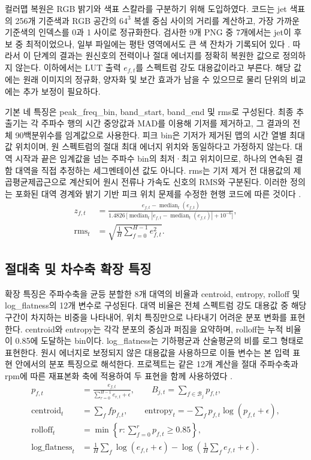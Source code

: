 \documentclass[11pt,a4paper]{article}
\newcommand{\sourceproject}{\citep{project2026}}
\begin{document}
컬러맵 복원은 RGB 밝기와 색표 스칼라를 구분하기 위해 도입하였다.
코드는 jet 색표의 256개 기준색과 RGB 공간의 $64^3$ 복셀 중심 사이의 거리를 계산하고, 가장 가까운 기준색의 인덱스를 0과 1 사이로 정규화한다.
검사한 9개 PNG 중 7개에서는 jet이 후보 중 최적이었으나, 일부 파일에는 평탄 영역에서도 큰 색 잔차가 기록되어 있다 \sourceproject.
따라서 이 단계의 결과는 원신호의 전력이나 절대 에너지를 정확히 복원한 값으로 정의하지 않는다.
이하에서는 LUT 출력 $e_{f,t}$를 스펙트럼 강도 대용값이라고 부른다.
해당 값에는 원래 이미지의 정규화, 양자화 및 보간 효과가 남을 수 있으므로 물리 단위의 비교에는 추가 보정이 필요하다.

기본 네 특징은 peak\_freq\_bin, band\_start, band\_end 및 rms로 구성된다.
최종 추출기는 각 주파수 행의 시간 중앙값과 MAD를 이용해 기저를 제거하고, 그 결과의 전체 90백분위수를 임계값으로 사용한다.
피크 bin은 기저가 제거된 맵의 시간 열별 최대값 위치이며, 원 스펙트럼의 절대 최대 에너지 위치와 동일하다고 가정하지 않는다.
대역 시작과 끝은 임계값을 넘는 주파수 bin의 최저·최고 위치이므로, 하나의 연속된 결함 대역을 직접 추정하는 세그멘테이션 값도 아니다.
rms는 기저 제거 전 대용값의 제곱평균제곱근으로 계산되어 원시 전류나 가속도 신호의 RMS와 구분된다.
이러한 정의는 포화된 대역 경계와 밝기 기반 피크 위치 문제를 수정한 현행 코드에 따른 것이다 \sourceproject.
\begin{align}
 z_{f,t}&=\frac{e_{f,t}-\operatorname{median}_{t}(e_{f,t})}
 {1.4826\,\big[\operatorname{median}_{t}|e_{f,t}-\operatorname{median}_{t}(e_{f,t})|+10^{-6}\big]},\\
 \mathrm{rms}_t&=\sqrt{\frac{1}{H}\sum_{f=0}^{H-1}e_{f,t}^{2}}.
\end{align}

\subsection{절대축 및 차수축 확장 특징}
확장 특징은 주파수축을 균등 분할한 8개 대역의 비율과 centroid, entropy, rolloff 및 log\_flatness의 12개 변수로 구성된다.
대역 비율은 전체 스펙트럼 강도 대용값 중 해당 구간이 차지하는 비중을 나타내어, 위치 특징만으로 나타내기 어려운 분포 변화를 표현한다.
centroid와 entropy는 각각 분포의 중심과 퍼짐을 요약하며, rolloff는 누적 비율이 0.85에 도달하는 bin이다.
log\_flatness는 기하평균과 산술평균의 비를 로그 형태로 표현한다.
원시 에너지로 보정되지 않은 대용값을 사용하므로 이들 변수는 본 입력 표현 안에서의 분포 특징으로 해석한다.
프로젝트는 같은 12개 계산을 절대 주파수축과 rpm에 따른 재표본화 축에 적용하여 두 표현을 함께 사용하였다 \sourceproject.
\begin{align}
 p_{f,t}&=\frac{e_{f,t}}{\sum_{r=0}^{H-1}e_{r,t}+\epsilon},\qquad
 B_{j,t}=\sum_{f\in\mathcal{B}_j}p_{f,t},\\
 \mathrm{centroid}_t&=\sum_f f p_{f,t},\qquad
 \mathrm{entropy}_t=-\sum_f p_{f,t}\log(p_{f,t}+\epsilon),\\
 \mathrm{rolloff}_t&=\min\left\{r:\sum_{f=0}^{r}p_{f,t}\ge0.85\right\},\\
 \mathrm{log\_flatness}_t&=\frac{1}{H}\sum_f\log(e_{f,t}+\epsilon)
 -\log\left(\frac{1}{H}\sum_f e_{f,t}+\epsilon\right).
\end{align}
\end{document}
